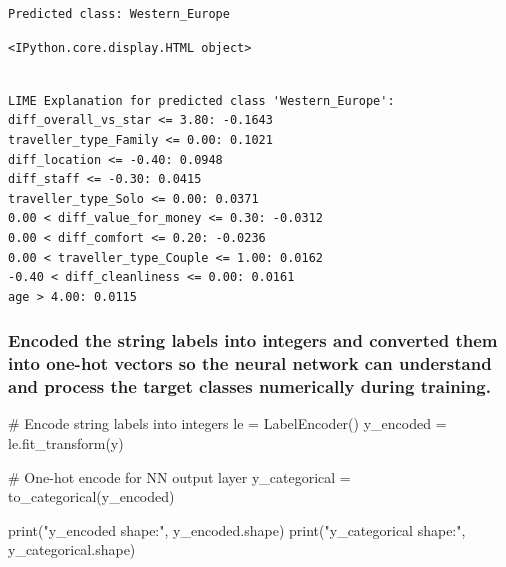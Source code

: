 \documentclass[
  letterpaper,
  DIV=11,
  numbers=noendperiod]{scrartcl}
\newenvironment{Shaded}{\begin{snugshade}}{\end{snugshade}}
\newcommand{\BuiltInTok}[1]{\textcolor[rgb]{0.00,0.23,0.31}{#1}}
\newcommand{\CommentTok}[1]{\textcolor[rgb]{0.37,0.37,0.37}{#1}}
\newcommand{\NormalTok}[1]{\textcolor[rgb]{0.00,0.23,0.31}{#1}}
\newcommand{\OperatorTok}[1]{\textcolor[rgb]{0.37,0.37,0.37}{#1}}
\newcommand{\StringTok}[1]{\textcolor[rgb]{0.13,0.47,0.30}{#1}}
\begin{document}
\begin{verbatim}
Predicted class: Western_Europe
\end{verbatim}

\begin{verbatim}
<IPython.core.display.HTML object>
\end{verbatim}

\begin{verbatim}

LIME Explanation for predicted class 'Western_Europe':
diff_overall_vs_star <= 3.80: -0.1643
traveller_type_Family <= 0.00: 0.1021
diff_location <= -0.40: 0.0948
diff_staff <= -0.30: 0.0415
traveller_type_Solo <= 0.00: 0.0371
0.00 < diff_value_for_money <= 0.30: -0.0312
0.00 < diff_comfort <= 0.20: -0.0236
0.00 < traveller_type_Couple <= 1.00: 0.0162
-0.40 < diff_cleanliness <= 0.00: 0.0161
age > 4.00: 0.0115
\end{verbatim}

\subsubsection{Encoded the string labels into integers and converted
them into one-hot vectors so the neural network can understand and
process the target classes numerically during
training.}\label{encoded-the-string-labels-into-integers-and-converted-them-into-one-hot-vectors-so-the-neural-network-can-understand-and-process-the-target-classes-numerically-during-training.}

\begin{Shaded}
\begin{Highlighting}[]
\CommentTok{\# Encode string labels into integers}
\NormalTok{le }\OperatorTok{=}\NormalTok{ LabelEncoder()}
\NormalTok{y\_encoded }\OperatorTok{=}\NormalTok{ le.fit\_transform(y)}

\CommentTok{\# One{-}hot encode for NN output layer}
\NormalTok{y\_categorical }\OperatorTok{=}\NormalTok{ to\_categorical(y\_encoded)}
\end{Highlighting}
\end{Shaded}

\begin{Shaded}
\begin{Highlighting}[]
\BuiltInTok{print}\NormalTok{(}\StringTok{"y\_encoded shape:"}\NormalTok{, y\_encoded.shape)}
\BuiltInTok{print}\NormalTok{(}\StringTok{"y\_categorical shape:"}\NormalTok{, y\_categorical.shape)}
\end{Highlighting}
\end{Shaded}
\end{document}
